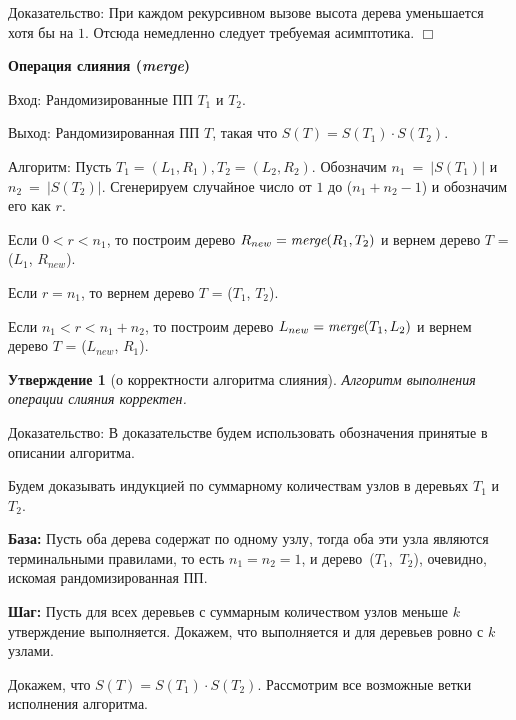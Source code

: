 \documentclass[14pt]{article}
\newtheorem{claim}{Утверждение}[section]
\begin{document}
{\sc Доказательство:} При каждом рекурсивном вызове высота дерева
уменьшается хотя бы на $1$. Отсюда немедленно следует требуемая асимптотика. $\Box$

{\bf Операция слияния (\emph{merge})}

{\sc Вход:} Рандомизированные ПП $T_1$ и $T_2$.

{\sc Выход:} Рандомизированная ПП $T$, такая что $S(T) = S(T_1) \cdot S(T_2)$.

{\sc Алгоритм:} Пусть $T_1 = (L_1, R_1), T_2 = (L_2, R_2)$.
Обозначим $n_1~=~\left|S(T_1)\right|$ и $n_2~=~\left|S(T_2)\right|$. Сгенерируем случайное число 
от $1$ до ($n_1 + n_2 - 1$) и обозначим его как $r$.
\begin{enumerate}
	\begin{item}
		Если $0 < r < n_1$, то построим дерево $R_{new} = \emph{merge}(R_1, T_2)$ 
		и вернем дерево $T$ = ($L_1$, $R_{new}$).
	\end{item}
	\begin{item}
		Если $r = n_1$, то вернем дерево $T$ = ($T_1$, $T_2$).
	\end{item}
	\begin{item}
		Если $n_1 < r < n_1 + n_2$, то построим дерево $L_{new} = \emph{merge}(T_1, L_2)$ 
		и вернем дерево $T$ = ($L_{new}$, $R_1$).
	\end{item}
\end{enumerate}

\begin{claim}[о корректности алгоритма слияния] 
	Алгоритм выполнения операции слияния корректен.
\end{claim}

{\sc Доказательство:} В доказательстве будем использовать обозначения
принятые в описании алгоритма.

Будем доказывать индукцией по суммарному количествам узлов в деревьях $T_1$ и
$T_2$.

{\bf База:} Пусть оба дерева содержат по одному узлу, тогда оба эти узла
являются терминальными правилами, то есть $n_1 = n_2 = 1$, и дерево~($T_1$,~$T_2$),
очевидно, искомая рандомизированная ПП.

{\bf Шаг:} Пусть для всех деревьев с суммарным количеством узлов меньше $k$
утверждение выполняется. Докажем, что выполняется и для деревьев ровно с $k$
узлами.

Докажем, что $S(T) = S(T_1) \cdot S(T_2)$. Рассмотрим все возможные ветки исполнения алгоритма.
\end{document}
